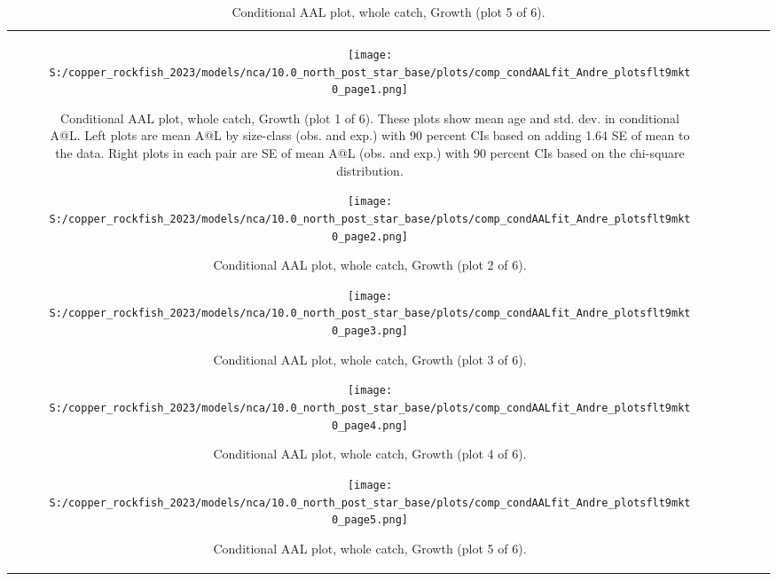 \documentclass[11pt,
  letterpaper,
]{article}
\begin{document}
\begin{longtable}[t]{c>{\centering\arraybackslash}p{2cm}>{\centering\arraybackslash}p{2cm}>{\centering\arraybackslash}p{2cm}}
\begin{figure}
{\centering
\texttt{[image: S:/copper\_rockfish\_2023/models/nca/10.0\_north\_post\_star\_base/plots/comp\_condAALfit\_Andre\_plotsflt9mkt0\_page1.png]}
}
\caption{Conditional AAL plot, whole catch, Growth (plot 1 of 6). These plots show mean age and std. dev. in conditional A@L. Left plots are mean A@L by size-class (obs. and exp.) with 90 percent CIs based on adding 1.64 SE of mean to the data. Right plots in each pair are SE of mean A@L (obs. and exp.) with 90 percent CIs based on the chi-square distribution.\label{fig:comp-condAALfit-Andre-plotsflt9mkt0-page1}}
\end{figure}

\begin{figure}
{\centering
\texttt{[image: S:/copper\_rockfish\_2023/models/nca/10.0\_north\_post\_star\_base/plots/comp\_condAALfit\_Andre\_plotsflt9mkt0\_page2.png]}
}
\caption{Conditional AAL plot, whole catch, Growth (plot 2 of 6).\label{fig:comp-condAALfit-Andre-plotsflt9mkt0-page2}}
\end{figure}

\begin{figure}
{\centering
\texttt{[image: S:/copper\_rockfish\_2023/models/nca/10.0\_north\_post\_star\_base/plots/comp\_condAALfit\_Andre\_plotsflt9mkt0\_page3.png]}
}
\caption{Conditional AAL plot, whole catch, Growth (plot 3 of 6).\label{fig:comp-condAALfit-Andre-plotsflt9mkt0-page3}}
\end{figure}

\begin{figure}
{\centering
\texttt{[image: S:/copper\_rockfish\_2023/models/nca/10.0\_north\_post\_star\_base/plots/comp\_condAALfit\_Andre\_plotsflt9mkt0\_page4.png]}
}
\caption{Conditional AAL plot, whole catch, Growth (plot 4 of 6).\label{fig:comp-condAALfit-Andre-plotsflt9mkt0-page4}}
\end{figure}

\begin{figure}
{\centering
\texttt{[image: S:/copper\_rockfish\_2023/models/nca/10.0\_north\_post\_star\_base/plots/comp\_condAALfit\_Andre\_plotsflt9mkt0\_page5.png]}
}
\caption{Conditional AAL plot, whole catch, Growth (plot 5 of 6).\label{fig:comp-condAALfit-Andre-plotsflt9mkt0-page5}}
\end{figure}


\end{longtable}
\end{document}
